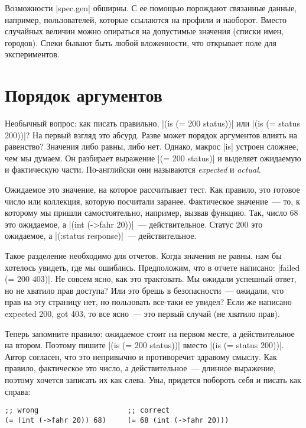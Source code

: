 Возможности \spverb|spec.gen| обширны. С ее помощью порождают связанные данные,
например, пользователей, которые ссылаются на профили и наоборот. Вместо
случайных величин можно опираться на допустимые значения (списки имен,
городов). Спеки бывают быть любой вложенности, что открывает поле для
экспериментов.


\section{Порядок аргументов}

Необычный вопрос: как писать правильно, \spverb|(is (= 200 status))| или
\spverb|(is (= status 200))|? На первый взгляд это абсурд. Разве может порядок
аргументов влиять на равенство? Значения либо равны, либо нет. Однако, макрос
\spverb|is| устроен сложнее, чем мы думаем. Он разбирает выражение \spverb|(= 200 status)|
и выделяет ожидаемую и фактическую части. По-английски они
называются \emph{expected} и \emph{actual}.

Ожидаемое это значение, на которое рассчитывает тест. Как правило, это готовое
число или коллекция, которую посчитали заранее. Фактическое значение~--- то, к
которому мы пришли самостоятельно, например, вызвав функцию. Так, число 68 это
ожидаемое, а \spverb|(int (->fahr 20))|~--- действительное. Статус 200 это ожидаемое, а
\spverb|(:status response)|~--- действительное.

Такое разделение необходимо для отчетов. Когда значения не равны, нам бы
хотелось увидеть, где мы ошиблись. Предположим, что в отчете написано:
\spverb|failed (= 200 403)|. Не совсем ясно, как это трактовать. Мы ожидали
успешный ответ, но не хватило прав доступа? Или это брешь в безопасности~---
ожидали, что прав на эту страницу нет, но пользовать все-таки ее увидел? Если же
написано expected 200, got 403, то все ясно~--- это первый случай (не хватило
прав).

Теперь запомните правило: ожидаемое стоит на первом месте, а действительное на
втором. Поэтому пишите \spverb|(is (= 200 status))| вместо \spverb|(is (= status 200))|. Автор
согласен, что это непривычно и противоречит здравому смыслу. Как правило,
фактическое это число, а действительное~--- длинное выражение, поэтому хочется
записать их как слева. Увы, придется побороть себя и писать как справа:

\begin{verbatim}
;; wrong                     ;; correct
(= (int (->fahr 20)) 68)     (= 68 (int (->fahr 20)))
\end{verbatim}

